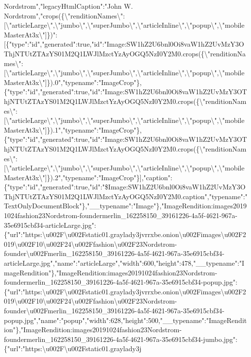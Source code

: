 Nordstrom","legacyHtmlCaption":"John W.
Nordstrom","crops(\{\textbackslash{}"renditionNames\textbackslash{}":{[}\textbackslash{}"articleLarge\textbackslash{}",\textbackslash{}"jumbo\textbackslash{}",\textbackslash{}"superJumbo\textbackslash{}",\textbackslash{}"articleInline\textbackslash{}",\textbackslash{}"popup\textbackslash{}",\textbackslash{}"mobileMasterAt3x\textbackslash{}"{]}\})":{[}\{"type":"id","generated":true,"id":"Image:SW1hZ2U6bnl0Oi8vaW1hZ2UvMzY3OThjNTUtZTAzYS01M2Q1LWJlMzctYzAyOGQ5NzI0Y2M0.crops(\{\textbackslash{}"renditionNames\textbackslash{}":{[}\textbackslash{}"articleLarge\textbackslash{}",\textbackslash{}"jumbo\textbackslash{}",\textbackslash{}"superJumbo\textbackslash{}",\textbackslash{}"articleInline\textbackslash{}",\textbackslash{}"popup\textbackslash{}",\textbackslash{}"mobileMasterAt3x\textbackslash{}"{]}\}).0","typename":"ImageCrop"\},\{"type":"id","generated":true,"id":"Image:SW1hZ2U6bnl0Oi8vaW1hZ2UvMzY3OThjNTUtZTAzYS01M2Q1LWJlMzctYzAyOGQ5NzI0Y2M0.crops(\{\textbackslash{}"renditionNames\textbackslash{}":{[}\textbackslash{}"articleLarge\textbackslash{}",\textbackslash{}"jumbo\textbackslash{}",\textbackslash{}"superJumbo\textbackslash{}",\textbackslash{}"articleInline\textbackslash{}",\textbackslash{}"popup\textbackslash{}",\textbackslash{}"mobileMasterAt3x\textbackslash{}"{]}\}).1","typename":"ImageCrop"\},\{"type":"id","generated":true,"id":"Image:SW1hZ2U6bnl0Oi8vaW1hZ2UvMzY3OThjNTUtZTAzYS01M2Q1LWJlMzctYzAyOGQ5NzI0Y2M0.crops(\{\textbackslash{}"renditionNames\textbackslash{}":{[}\textbackslash{}"articleLarge\textbackslash{}",\textbackslash{}"jumbo\textbackslash{}",\textbackslash{}"superJumbo\textbackslash{}",\textbackslash{}"articleInline\textbackslash{}",\textbackslash{}"popup\textbackslash{}",\textbackslash{}"mobileMasterAt3x\textbackslash{}"{]}\}).2","typename":"ImageCrop"\}{]},"caption":\{"type":"id","generated":true,"id":"\$Image:SW1hZ2U6bnl0Oi8vaW1hZ2UvMzY3OThjNTUtZTAzYS01M2Q1LWJlMzctYzAyOGQ5NzI0Y2M0.caption","typename":"TextOnlyDocumentBlock"\},"\_\_typename":"Image"\},"ImageRendition:images20191024fashion23Nordstrom-foundermerlin\_162258150\_39161226-4a5f-4621-967a-35e6915cbf34-articleLarge.jpg":\{"url":"https:\textbackslash{}u002F\textbackslash{}u002Fstatic01.graylady3jvrrxbe.onion\textbackslash{}u002Fimages\textbackslash{}u002F2019\textbackslash{}u002F10\textbackslash{}u002F24\textbackslash{}u002Ffashion\textbackslash{}u002F23Nordstrom-founder\textbackslash{}u002Fmerlin\_162258150\_39161226-4a5f-4621-967a-35e6915cbf34-articleLarge.jpg","name":"articleLarge","width":600,"height":478,"\_\_typename":"ImageRendition"\},"ImageRendition:images20191024fashion23Nordstrom-foundermerlin\_162258150\_39161226-4a5f-4621-967a-35e6915cbf34-popup.jpg":\{"url":"https:\textbackslash{}u002F\textbackslash{}u002Fstatic01.graylady3jvrrxbe.onion\textbackslash{}u002Fimages\textbackslash{}u002F2019\textbackslash{}u002F10\textbackslash{}u002F24\textbackslash{}u002Ffashion\textbackslash{}u002F23Nordstrom-founder\textbackslash{}u002Fmerlin\_162258150\_39161226-4a5f-4621-967a-35e6915cbf34-popup.jpg","name":"popup","width":628,"height":500,"\_\_typename":"ImageRendition"\},"ImageRendition:images20191024fashion23Nordstrom-foundermerlin\_162258150\_39161226-4a5f-4621-967a-35e6915cbf34-jumbo.jpg":\{"url":"https:\textbackslash{}u002F\textbackslash{}u002Fstatic01.graylady3j